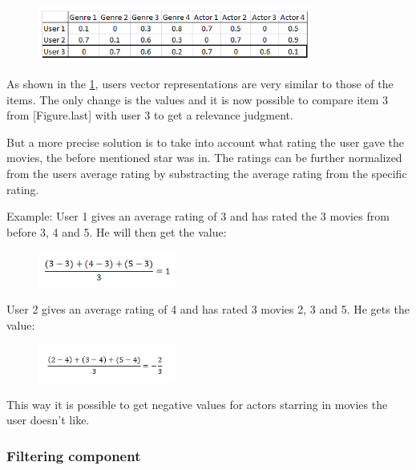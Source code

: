 \begin{figure}[H]
\centering
\includegraphics[width=0.8\textwidth]{Images/VectorrepresentationUsers.png}
\caption{}
\label{VrepUser}
\end{figure}

As shown in the \ref{VrepUser}, users vector representations are very similar to those of the items. The only change is the values and it is now possible to compare item 3 from [Figure.last] with user 3 to get a relevance judgment.

But a more precise solution is to take into account what rating the user gave the movies, the before mentioned star was in. The ratings can be further normalized from the users average rating by substracting the average rating from the specific rating.

Example:
User 1 gives an average rating of 3 and has rated the 3 movies from before 3, 4 and 5. He will then get the value:

\begin{figure}[H]
\centering
\includegraphics[width=0.4\textwidth]{Images/Userfeature1.png}
\caption{}
\label{Feature1}
\end{figure}

User 2 gives an average rating of 4 and has rated 3 movies 2, 3 and 5. He gets the value:

\begin{figure}[H]
\centering
\includegraphics[width=0.4\textwidth]{Images/Userfeature2.png}
\caption{}
\label{Feature2}
\end{figure}

This way it is possible to get negative values for actors starring in movies the user doesn't like.

 
\subsubsection{Filtering component}


